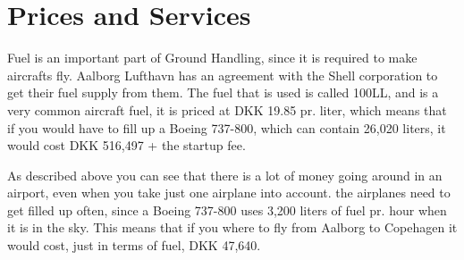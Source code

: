 \section{Prices and Services}

Fuel is an important part of Ground Handling, since it is required to make aircrafts fly. Aalborg Lufthavn has an agreement with the Shell corporation to get their fuel supply from them. The fuel that is used is called 100LL, and is a very common aircraft fuel, it is priced at DKK 19.85 pr. liter, which means that if you would have to fill up a Boeing 737-800, which can contain 26,020 liters, it would cost DKK 516,497 + the startup fee.

As described above you can see that there is a lot of money going around in an airport, even when you take just one airplane into account. the airplanes need to get filled up often, since a Boeing 737-800 uses 3,200 liters of fuel pr. hour when it is in the sky. This means that if you where to fly from Aalborg to Copehagen it would cost, just in terms of fuel, DKK 47,640.

